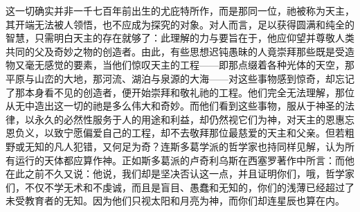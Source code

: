 \par

这一切确实并非一千七百年前出生的尤庇特所作，而是那同一位，祂被称为天主，其开端无法被人领悟，也不应成为探究的对象。对人而言，足以获得圆满和纯全的智慧，只需明白天主的存在就够了：此理解的力与要旨在于，他应仰望并尊敬人类共同的父及奇妙之物的创造者。由此，有些思想迟钝愚昧的人竟崇拜那些既是受造物又毫无感觉的要素，当他们惊叹天主的工程——即那点缀着各种光体的天空，那平原与山峦的大地，那河流、湖泊与泉源的大海——对这些事物感到惊奇，却忘记了那本身看不见的创造者，便开始崇拜和敬礼祂的工程。他们完全无法理解，那位从无中造出这一切的祂是多么伟大和奇妙。而他们看到这些事物，服从于神圣的法律，以永久的必然性服务于人的用途和利益，却仍然视它们为神，对天主的恩惠忘恩负义，以致宁愿偏爱自己的工程，却不去敬拜那位最慈爱的天主和父亲。但若粗野或无知的凡人犯错，又何足为奇？连斯多葛学派的哲学家也持同样见解，认为所有运行的天体都应算作神。正如斯多葛派的卢奇利乌斯在西塞罗著作中所言：而他在此之前不久又说：他说，我们却是坚决否认这一点，并且证明你们，哦，哲学家们，不仅不学无术和不虔诚，而且是盲目、愚蠢和无知的，你们的浅薄已经超过了未受教育者的无知。因为他们只视太阳和月亮为神，而你们却连星辰也算在内。\par

